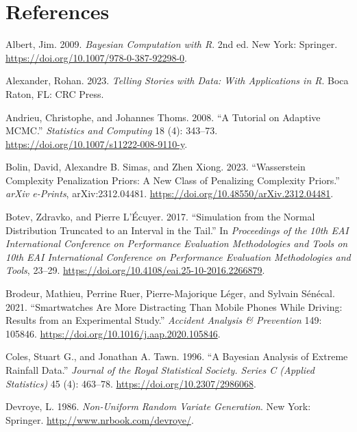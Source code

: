 \documentclass[
  11pt,
  letterpaper,
]{scrbook}
\newlength{\cslhangindent}
\newenvironment{CSLReferences}[2] %
 {\begin{list}{}{%
  \setlength{\itemindent}{0pt}
  \setlength{\leftmargin}{0pt}
  \setlength{\parsep}{0pt}
  \ifodd #1
   \setlength{\leftmargin}{\cslhangindent}
   \setlength{\itemindent}{-1\cslhangindent}
  \fi
  \setlength{\itemsep}{#2\baselineskip}}}
 {\end{list}}
\theoremstyle{definition}
\theoremstyle{plain}
\theoremstyle{plain}
\theoremstyle{definition}
\theoremstyle{definition}
\theoremstyle{remark}
\begin{document}
\chapter{References}\label{references}

\label{refs}
\begin{CSLReferences}{1}{0}
Albert, Jim. 2009. \emph{Bayesian Computation with {R}}. 2nd ed. New
York: Springer. \url{https://doi.org/10.1007/978-0-387-92298-0}.

Alexander, Rohan. 2023. \emph{Telling Stories with Data: With
Applications in {R}}. Boca Raton, FL: CRC Press.

Andrieu, Christophe, and Johannes Thoms. 2008. {``A Tutorial on Adaptive
{MCMC}.''} \emph{Statistics and Computing} 18 (4): 343--73.
\url{https://doi.org/10.1007/s11222-008-9110-y}.

Bolin, David, Alexandre B. Simas, and Zhen Xiong. 2023. {``{W}asserstein
Complexity Penalization Priors: A New Class of Penalizing Complexity
Priors.''} \emph{arXiv e-Prints}, arXiv:2312.04481.
\url{https://doi.org/10.48550/arXiv.2312.04481}.

Botev, Zdravko, and Pierre L'Écuyer. 2017. {``Simulation from the Normal
Distribution Truncated to an Interval in the Tail.''} In
\emph{Proceedings of the 10th EAI International Conference on
Performance Evaluation Methodologies and Tools on 10th EAI International
Conference on Performance Evaluation Methodologies and Tools}, 23--29.
\url{https://doi.org/10.4108/eai.25-10-2016.2266879}.

Brodeur, Mathieu, Perrine Ruer, Pierre-Majorique Léger, and Sylvain
Sénécal. 2021. {``Smartwatches Are More Distracting Than Mobile Phones
While Driving: Results from an Experimental Study.''} \emph{Accident
Analysis \& Prevention} 149: 105846.
\url{https://doi.org/10.1016/j.aap.2020.105846}.

Coles, Stuart G., and Jonathan A. Tawn. 1996. {``A {B}ayesian Analysis
of Extreme Rainfall Data.''} \emph{Journal of the Royal Statistical
Society. Series C (Applied Statistics)} 45 (4): 463--78.
\url{https://doi.org/10.2307/2986068}.

Devroye, L. 1986. \emph{Non-Uniform Random Variate Generation}. New
York: Springer. \url{http://www.nrbook.com/devroye/}.


\end{CSLReferences}
\end{document}
